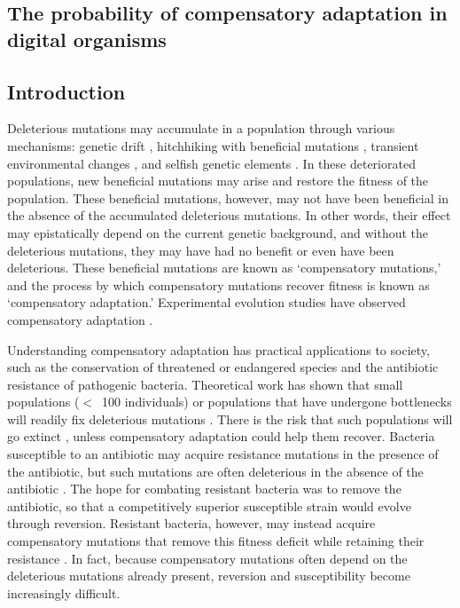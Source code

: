 \begin{doublespace}

\chapter{The probability of compensatory adaptation in digital organisms}
\label{chap:comp_rate}



\section{Introduction}

Deleterious mutations may accumulate in a population
through various mechanisms: genetic drift \citep{lan94,lyn95},
hitchhiking with beneficial mutations \citep{chu11},
transient environmental changes \citep{bjo00},
and selfish genetic elements \citep{pre10}.
%
In these deteriorated populations, new beneficial mutations
may arise and restore the fitness of the population.
%
These beneficial mutations, however, may not have been beneficial
in the absence of the accumulated deleterious mutations.
%
In other words, their effect may epistatically depend
on the current genetic background, and without the deleterious mutations,
they may have had no benefit or even have been deleterious.
%
These beneficial mutations are known as `compensatory mutations,'
and the process by which compensatory mutations recover fitness
is known as `compensatory adaptation.'
%
Experimental evolution studies have observed compensatory adaptation
\citep{har96,bur99,moo00,lev00,mai02,est03,est11}.



Understanding compensatory adaptation has practical applications to society,
such as the conservation of threatened or endangered species
and the antibiotic resistance of pathogenic bacteria.
%
Theoretical work has shown that small populations
($<$~100 individuals) or populations that have undergone bottlenecks
will readily fix deleterious mutations \citep{whi03}.
%
There is the risk that such populations will go extinct \citep{lyn95,lan94},
unless compensatory adaptation could help them recover.
%
Bacteria susceptible to an antibiotic may acquire resistance mutations
in the presence of the antibiotic, but such mutations
are often deleterious in the absence of the antibiotic \citep{sch97,lev00}.
%
The hope for combating resistant bacteria was to remove the antibiotic,
so that a competitively superior susceptible strain
would evolve through reversion.
%
Resistant bacteria, however, may instead acquire compensatory mutations
that remove this fitness deficit while retaining their resistance
\citep{sch97,lev00,bjo00,mai02,pau07,per10}.
%
In fact, because compensatory mutations often depend on
the deleterious mutations already present,
reversion and susceptibility become increasingly difficult.




\end{doublespace}
